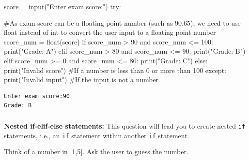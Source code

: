 \documentclass[
  letterpaper,
  DIV=11,
  numbers=noendperiod]{scrreprt}
\newenvironment{Shaded}{\begin{snugshade}}{\end{snugshade}}
\newcommand{\BuiltInTok}[1]{\textcolor[rgb]{0.00,0.23,0.31}{#1}}
\newcommand{\CommentTok}[1]{\textcolor[rgb]{0.37,0.37,0.37}{#1}}
\newcommand{\ControlFlowTok}[1]{\textcolor[rgb]{0.00,0.23,0.31}{#1}}
\newcommand{\DecValTok}[1]{\textcolor[rgb]{0.68,0.00,0.00}{#1}}
\newcommand{\KeywordTok}[1]{\textcolor[rgb]{0.00,0.23,0.31}{#1}}
\newcommand{\NormalTok}[1]{\textcolor[rgb]{0.00,0.23,0.31}{#1}}
\newcommand{\OperatorTok}[1]{\textcolor[rgb]{0.37,0.37,0.37}{#1}}
\newcommand{\StringTok}[1]{\textcolor[rgb]{0.13,0.47,0.30}{#1}}
\begin{document}
\begin{Shaded}
\begin{Highlighting}[]
\NormalTok{score }\OperatorTok{=} \BuiltInTok{input}\NormalTok{(}\StringTok{"Enter exam score:"}\NormalTok{)}
\ControlFlowTok{try}\NormalTok{:}
    
    \CommentTok{\#As exam score can be a floating point number (such as 90.65), we need to use \textquotesingle{}float\textquotesingle{} instead of \textquotesingle{}int\textquotesingle{} to convert the user input to a floating point number}
\NormalTok{    score\_num }\OperatorTok{=} \BuiltInTok{float}\NormalTok{(score)}
    \ControlFlowTok{if}\NormalTok{ score\_num }\OperatorTok{\textgreater{}} \DecValTok{90} \KeywordTok{and}\NormalTok{ score\_num }\OperatorTok{\textless{}=} \DecValTok{100}\NormalTok{:}
        \BuiltInTok{print}\NormalTok{(}\StringTok{"Grade: A"}\NormalTok{)}
    \ControlFlowTok{elif}\NormalTok{ score\_num }\OperatorTok{\textgreater{}} \DecValTok{80} \KeywordTok{and}\NormalTok{ score\_num }\OperatorTok{\textless{}=} \DecValTok{90}\NormalTok{:}
        \BuiltInTok{print}\NormalTok{(}\StringTok{"Grade: B"}\NormalTok{)}
    \ControlFlowTok{elif}\NormalTok{ score\_num }\OperatorTok{\textgreater{}=} \DecValTok{0} \KeywordTok{and}\NormalTok{ score\_num }\OperatorTok{\textless{}=} \DecValTok{80}\NormalTok{:}
        \BuiltInTok{print}\NormalTok{(}\StringTok{"Grade: C"}\NormalTok{)}
    \ControlFlowTok{else}\NormalTok{:}
        \BuiltInTok{print}\NormalTok{(}\StringTok{"Invalid score"}\NormalTok{)     }\CommentTok{\#If a number is less than 0 or more than 100}
\ControlFlowTok{except}\NormalTok{:}
    \BuiltInTok{print}\NormalTok{(}\StringTok{"Invalid input"}\NormalTok{)         }\CommentTok{\#If the input is not a number}
\end{Highlighting}
\end{Shaded}

\begin{verbatim}
Enter exam score:90
Grade: B
\end{verbatim}

\hypertarget{section-1}{%
\subsubsection{}\label{section-1}}

\textbf{Nested if-elif-else statements:} This question will lead you to
create nested \texttt{if} statements, i.e., an \texttt{if} statement
within another \texttt{if} statement.

Think of a number in {[}1,5{]}. Ask the user to guess the number.
\end{document}
